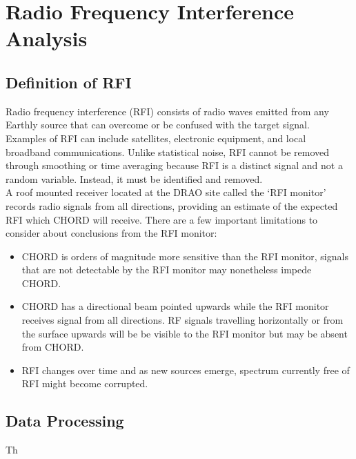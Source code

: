 \section{Radio Frequency Interference Analysis}

\subsection{Definition of RFI}
Radio frequency interference (RFI) consists of radio waves emitted from any Earthly source that can overcome or be confused with the target signal. Examples of RFI can include satellites, electronic equipment, and local broadband communications. Unlike statistical noise, RFI cannot be removed through smoothing or time averaging because RFI is a distinct signal and not a random variable. Instead, it must be identified and removed.\\

A roof mounted receiver located at the DRAO site called the `RFI monitor' records radio signals from all directions, providing an estimate of the expected RFI which CHORD will receive. There are a few important limitations to consider about conclusions from the RFI monitor:
\begin{itemize}
    \item CHORD is orders of magnitude more sensitive than the RFI monitor, signals that are not detectable by the RFI monitor may nonetheless impede CHORD.
    \item CHORD has a directional beam pointed upwards while the RFI monitor receives signal from all directions. RF signals travelling horizontally or from the surface upwards will be be visible to the RFI monitor but may be absent from CHORD.
    \item RFI changes over time and as new sources emerge, spectrum currently free of RFI might become corrupted.
\end{itemize}

\subsection{Data Processing}
Th



